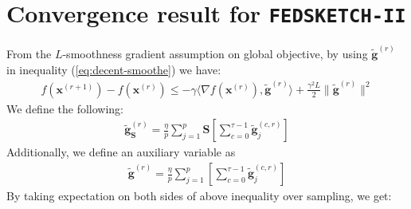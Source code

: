 \section{Convergence result for \texttt{FEDSKETCH-II}}
From the $L$-smoothness gradient assumption on global objective, by using  $\tilde{\mathbf{g}}^{(r)}$ in inequality (\ref{eq:decent-smoothe}) we have:
\begin{align}
    f({\boldsymbol{x}}^{(r+1)})-f({\boldsymbol{x}}^{(r)})\leq -\gamma \big\langle\nabla f({\boldsymbol{x}}^{(r)}),\tilde{\mathbf{g}}^{(r)}\big\rangle+\frac{\gamma^2 L}{2}\|\tilde{\mathbf{g}}^{(r)}\|^2\label{eq:Lipschitz-c1}
\end{align}
We define the following:
\begin{align}
    \tilde{\mathbf{g}}_{\mathbf{S}}^{(r)}=\frac{\eta}{p}\sum_{j=1}^{p}\mathbf{S}\left[\sum_{c=0}^{\tau-1}\tilde{\mathbf{g}}_j^{(c,r)}\right]
\end{align}
Additionally, we define an auxiliary variable as 
\begin{align}
    \tilde{\mathbf{g}}^{(r)}=\frac{\eta}{p}\sum_{j=1}^{p}\left[\sum_{c=0}^{\tau-1}\tilde{\mathbf{g}}_j^{(c,r)}\right]
\end{align}
By taking expectation on both sides of above inequality over sampling, we get:
